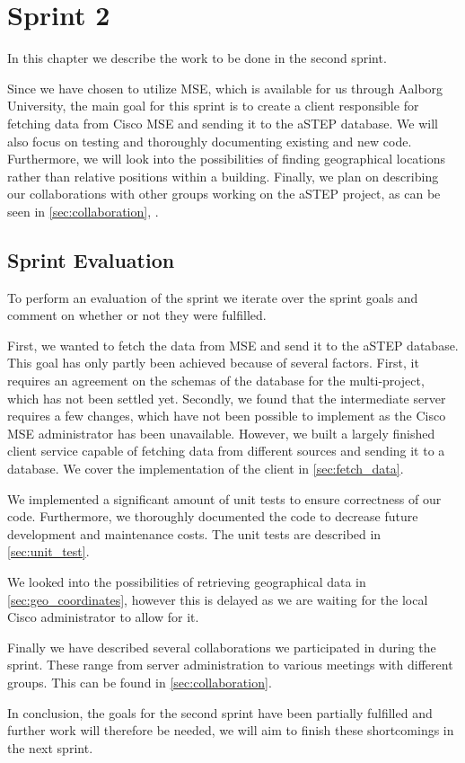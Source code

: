 \chapter{Sprint 2} \label{cha:sprint2}
In this chapter we describe the work to be done in the second sprint. 

Since we have chosen to utilize MSE, which is available for us through Aalborg University, the main goal for this sprint is to create a client responsible for fetching data from Cisco MSE and sending it to the aSTEP database. We will also focus on testing and thoroughly documenting existing and new code. Furthermore, we will look into the possibilities of finding geographical locations rather than relative positions within a building. Finally, we plan on describing our collaborations with other groups working on the aSTEP project, as can be seen in \cref{sec:collaboration}, .





\section{Sprint Evaluation}\label{sec:s2_eval}
To perform an evaluation of the sprint we iterate over the sprint goals and comment on whether or not they were fulfilled.

First, we wanted to fetch the data from MSE and send it to the aSTEP database. This goal has only partly been achieved because of several factors. First, it requires an agreement on the schemas of the database for the multi-project, which has not been settled yet. Secondly, we found that the intermediate server requires a few changes, which have not been possible to implement as the Cisco MSE administrator has been unavailable. However, we built a largely finished client service capable of fetching data from different sources and sending it to a database. We cover the implementation of the client in \cref{sec:fetch_data}.

We implemented a significant amount of unit tests to ensure correctness of our code. Furthermore, we thoroughly documented the code to decrease future development and maintenance costs. The unit tests are described in \cref{sec:unit_test}.

We looked into the possibilities of retrieving geographical data in \cref{sec:geo_coordinates}, however this is delayed as we are waiting for the local Cisco administrator to allow for it.

Finally we have described several collaborations we participated in during the sprint. These range from server administration to various meetings with different groups. This can be found in \cref{sec:collaboration}. 

In conclusion, the goals for the second sprint have been partially fulfilled and further work will therefore be needed, we will aim to finish these shortcomings in the next sprint.
